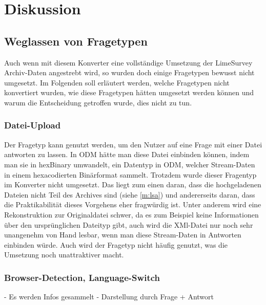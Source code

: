 \chapter{Diskussion}
\label{ch:diskussion}



\section{Weglassen von Fragetypen}

Auch wenn mit diesem Konverter eine vollständige Umsetzung der LimeSurvey Archiv-Daten angestrebt wird, so wurden doch einige Fragetypen bewusst nicht umgesetzt.
Im Folgenden soll erläutert werden, welche Fragetypen nicht konvertiert wurden, wie diese Fragetypen hätten umgesetzt werden können und warum die Entscheidung getroffen wurde, dies nicht zu tun.

\subsection{Datei-Upload}

Der Fragetyp  kann genutzt werden, um den Nutzer auf eine Frage mit einer Datei antworten zu lassen.
In ODM hätte man diese Datei einbinden können, indem man sie in hexBinary umwandelt, ein Datentyp in ODM, welcher Stream-Daten in einem hexacodierten Binärformat sammelt.
Trotzdem wurde dieser Fragentyp im Konverter nicht umgesetzt.
Das liegt zum einen daran, dass die hochgeladenen Dateien nicht Teil des Archives sind (siehe \cref{m:lsa}) und andererseits daran, dass die Praktikabilität dieses Vorgehens eher fragwürdig ist.
Unter anderem wird eine Rekonstruktion zur Originaldatei schwer, da es zum Beispiel keine Informationen über den ursprünglichen Dateityp gibt, auch wird die XMl-Datei nur noch sehr unangenehm von Hand lesbar, wenn man diese Stream-Daten in Antworten einbinden würde. 
Auch wird der Fragetyp nicht häufig genutzt, was die Umsetzung noch unattraktiver macht.

\subsection{Browser-Detection, Language-Switch}

- Es werden Infos gesammelt
- Darstellung durch Frage + Antwort

